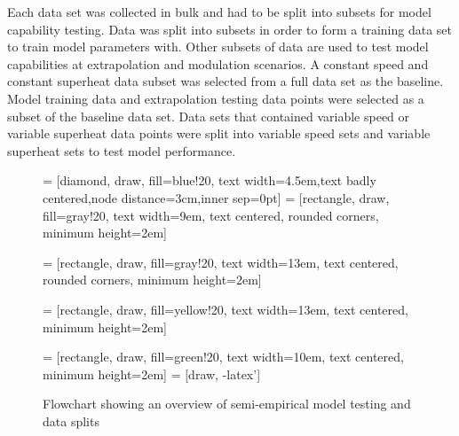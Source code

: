 \documentclass[preprint,11pt,authoryear]{elsarticle}
\begin{document}
Each data set was collected in bulk and had to be split into subsets for model capability testing. Data was split into subsets in order to form a training data set to train model parameters with. Other subsets of data are used to test model capabilities at extrapolation and modulation scenarios. A constant speed and constant superheat data subset was selected from a full data set as the baseline. Model training data and extrapolation testing data points were selected as a subset of the baseline data set. Data sets that contained variable speed or variable superheat data points were split into variable speed sets and variable superheat sets to test model performance.

\begin{figure}[h] %
\caption{Flowchart showing an overview of semi-empirical model testing and data splits}
 = [diamond, draw, fill=blue!20, text width=4.5em,text badly 									centered,node distance=3cm,inner sep=0pt]
  = [rectangle, draw, fill=gray!20, 
    text width=9em, text centered, rounded corners, minimum height=2em]
    
  = [rectangle, draw, fill=gray!20, 
    text width=13em, text centered, rounded corners, minimum height=2em]
      
  = [rectangle, draw, fill=yellow!20, 
    text width=13em, text centered, minimum height=2em]  
    
  = [rectangle, draw, fill=green!20, 
    text width=10em, text centered, minimum height=2em] 
 = [draw, -latex']

\begin{center}    
\end{center}
\end{figure}
\end{document}
